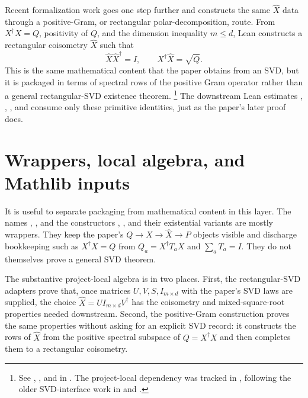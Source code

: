 \documentclass[11pt]{article}
\begin{document}
Recent formalization work goes one step further and constructs the same
$\widehat X$ data through a positive-Gram, or rectangular polar-decomposition,
route.  From $X^\dagger X=Q$, positivity of $Q$, and the dimension inequality
$m\le d$, Lean constructs a rectangular coisometry $\widehat X$ such that
\[
  \widehat X\widehat X^\dagger=I,
  \qquad
  X^\dagger\widehat X=\sqrt Q.
\]
This is the same mathematical content that the paper obtains from an SVD, but
it is packaged in terms of spectral rows of the positive Gram operator rather
than a general rectangular-SVD existence theorem.%
\footnote{See ,
, and
 in
.  The
project-local dependency was tracked in , following the older
SVD-interface work in  and .}
The downstream Lean estimates , ,
, and  consume only these primitive
identities, just as the paper's later proof does.

\section{Wrappers, local algebra, and Mathlib inputs}

It is useful to separate packaging from mathematical content in this layer.  The
names , , and the constructors
,
, and their existential
variants are mostly wrappers.  They keep the paper's $Q\to X\to\widehat X\to P$
objects visible and discharge bookkeeping such as $X^\dagger X=Q$ from
$Q_a=X^\dagger T_aX$ and $\sum_aT_a=I$.  They do not themselves prove a general
SVD theorem.

The substantive project-local algebra is in two places.  First, the
rectangular-SVD adapters prove that, once matrices $U,V,S,I_{m\times d}$ with
the paper's SVD laws are supplied, the choice
$\widehat X=UI_{m\times d}V^\dagger$ has the coisometry and mixed-square-root
properties needed downstream.  Second, the positive-Gram construction proves the
same properties without asking for an explicit SVD record: it constructs the
rows of $\widehat X$ from the positive spectral subspace of $Q=X^\dagger X$ and
then completes them to a rectangular coisometry.
\end{document}
